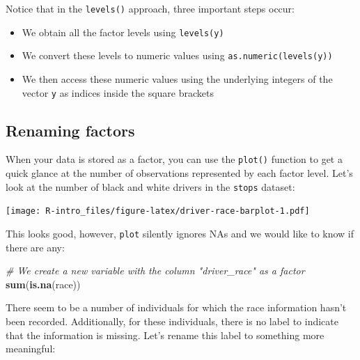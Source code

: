 \documentclass[
]{book}
\newenvironment{Shaded}{\begin{snugshade}}{\end{snugshade}}
\newcommand{\CommentTok}[1]{\textcolor[rgb]{0.56,0.35,0.01}{\textit{#1}}}
\newcommand{\FunctionTok}[1]{\textcolor[rgb]{0.13,0.29,0.53}{\textbf{#1}}}
\newcommand{\NormalTok}[1]{#1}
\newcommand{\OtherTok}[1]{\textcolor[rgb]{0.56,0.35,0.01}{#1}}
\newcommand{\SpecialCharTok}[1]{\textcolor[rgb]{0.81,0.36,0.00}{\textbf{#1}}}
\providecommand{\tightlist}{%
  \setlength{\itemsep}{0pt}\setlength{\parskip}{0pt}}
\begin{document}
Notice that in the \texttt{levels()} approach, three important steps occur:

\begin{itemize}
\tightlist
\item
  We obtain all the factor levels using \texttt{levels(y)}
\item
  We convert these levels to numeric values using \texttt{as.numeric(levels(y))}
\item
  We then access these numeric values using the underlying integers of the vector \texttt{y} as indices inside the square brackets
\end{itemize}

\hypertarget{renaming-factors}{%
\subsection{Renaming factors}\label{renaming-factors}}

When your data is stored as a factor, you can use the \texttt{plot()} function to get a quick glance at the number of observations represented by each factor
level. Let's look at the number of black and white drivers in the \texttt{stops} dataset:

\begin{Shaded}
\end{Shaded}

\texttt{[image: R-intro\_files/figure-latex/driver-race-barplot-1.pdf]}

This looks good, however, \texttt{plot} silently ignores NAs and we would like to know if there are any:

\begin{Shaded}
\begin{Highlighting}[]
\CommentTok{\# We create a new variable with the column "driver\_race" as a factor}
\FunctionTok{sum}\NormalTok{(}\FunctionTok{is.na}\NormalTok{(race))}
\end{Highlighting}
\end{Shaded}

There seem to be a number of individuals for which the race information hasn't been recorded. Additionally, for these individuals, there is no label to indicate that the information is missing. Let's rename this label to something more meaningful:
\end{document}
